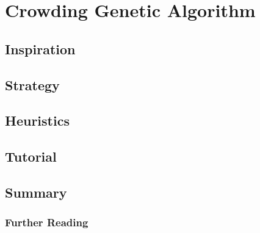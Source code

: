 \section{Crowding Genetic Algorithm}

\subsection{Inspiration}


\subsection{Strategy}


\subsection{Heuristics}


\subsection{Tutorial}


\subsection{Summary}


\subsubsection{Further Reading}